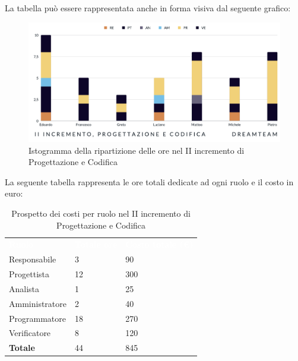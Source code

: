 La tabella può essere rappresentata anche in forma visiva dal seguente grafico:
\begin{figure}[H]
\centering
\includegraphics[scale=0.50]{Sezioni/SezioniPreventivo/grafici/progettazione/Progettazione_II_incremento.png}
\caption{Istogramma della ripartizione delle ore nel II incremento di Progettazione e Codifica}
\end{figure}

La seguente tabella rappresenta le ore totali dedicate ad ogni ruolo e il costo in euro:

\begin{table}[H]
\begin{center}
\renewcommand{\arraystretch}{1.5}
\begin{tabular}{ m{}<{\centering}  m{}<{\centering} m{}<{\centering}}
	\rowcolor{darkblue}
	\textcolor{white}{\textbf{Ruolo}}&\textcolor{white}{\textbf{Totale ore}}&\textcolor{white}{\textbf{Costo totale (\euro)}}\\ 

	Responsabile  & 3 & 90 \\	
	
	Progettista & 12 & 300 \\
	
	Analista & 1 & 25 \\

	Amministratore & 2 & 40 \\
	
	Programmatore & 18 & 270 \\
	
	Verificatore & 8 & 120 \\
	
	\textbf{Totale} & 44 & 845 \\
	
\end{tabular}
\caption{Prospetto dei costi per ruolo nel II incremento di Progettazione e Codifica}
\end{center}
\end{table}


